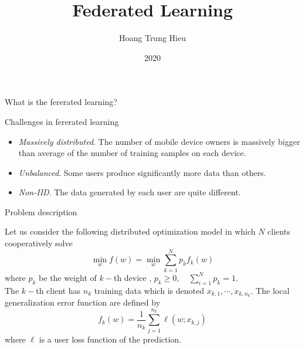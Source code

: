 \documentclass{beamer}
\title[Federated Learning]{Federated Learning}
\author{Hoang Trung Hieu}
\date{2020}
\begin{document}
\maketitle
\begin{frame}{What is the fererated learning?}
	



\begin{center}
\end{center}
\end{frame}
\begin{frame}{Challenges in fererated learning} 
 \begin{itemize}
 \item \textit{Massively distributed}. The number of mobile device owners is massively bigger than average of the number of training samples on each device.
 \item \textit{Unbalanced}. Some users produce significantly more data than others.
 \item \textit{Non-IID}.	The data generated by each user are quite different.
 \end{itemize}
\end{frame}
\begin{frame}{Problem description} 
		\begin{flushleft}
			Let us consider the following distributed optimization model in which $N$ clients cooperatively solve  $$\min_{w} f(w) = \min_{w} \sum_{k=1}^{N} p_k f_k(w)$$
	where $p_k$ be the weight of $k-$th device , $p_k \ge 0, \quad  \sum_{i=1}^{N}p_k=1.$\\ The $k-$th client has $n_k$ training data which is denoted $x_{k,1} , \cdots,  x_{k,n_k}.$ The local generalization error function are defined by $$f_k(w)= \frac{1}{n_k} \sum_{j=1}^{n_k} \ell (w;x_{k,j})$$
	where $\ell$ is a user loss function of the prediction.	
		\end{flushleft}
\end{frame}
\end{document}
